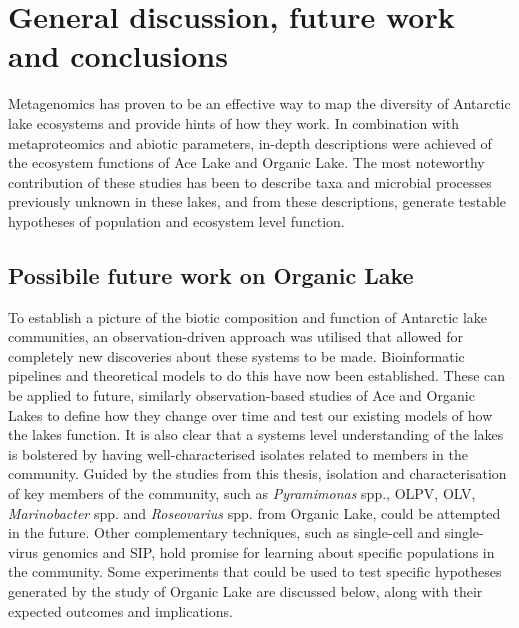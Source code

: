 \chapter{General discussion, future work and conclusions}
\label{ch:conc}

Metagenomics has proven to be an effective way to map the diversity of Antarctic lake ecosystems and provide hints of how they work.
In combination with metaproteomics and abiotic parameters, in-depth descriptions were achieved of the ecosystem functions of Ace Lake and Organic Lake.
The most noteworthy contribution of these studies has been to describe taxa and microbial processes previously unknown in these lakes, and from these descriptions, generate testable hypotheses of population and ecosystem level function.
\section{Possibile future work on Organic Lake}
To establish a picture of the biotic composition and function of Antarctic lake communities, an observation-driven approach was utilised that allowed for completely new discoveries about these systems to be made.
Bioinformatic pipelines and theoretical models to do this have now been established.
These can be applied to future, similarly observation-based studies of Ace and Organic Lakes to define how they change over time and test our existing models of how the lakes function.
It is also clear that a systems level understanding of the lakes is bolstered by having well-characterised isolates related to members in the community.
Guided by the studies from this thesis, isolation and characterisation of key members of the community, such as \emph{Pyramimonas} spp., \ac{OLPV}, \ac{OLV}, \emph{Marinobacter} spp. and \emph{Roseovarius} spp. from Organic Lake, could be attempted in the future.
Other complementary techniques, such as single-cell and single-virus genomics and \ac{SIP}, hold promise for learning about specific populations in the community.
Some experiments that could be used to test specific hypotheses generated by the study of Organic Lake are discussed below, along with their expected outcomes and implications.

